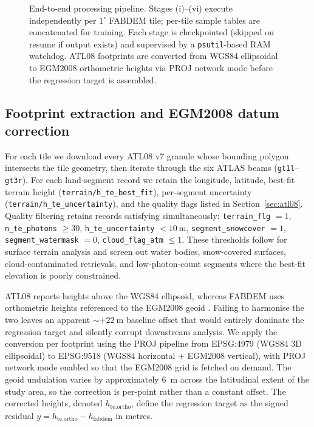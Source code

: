\documentclass[preprint,authoryear,number]{elsarticle}
\begin{document}
\begin{figure}[t]
\centering
\resizebox{\textwidth}{!}{}
\caption{End-to-end processing pipeline. Stages (i)--(vi) execute independently per $1^{\circ}$ FABDEM tile; per-tile sample tables are concatenated for training. Each stage is checkpointed (skipped on resume if output exists) and supervised by a \texttt{psutil}-based RAM watchdog. ATL08 footprints are converted from WGS84 ellipsoidal to EGM2008 orthometric heights via PROJ network mode before the regression target is assembled.}
\label{fig:pipeline}
\end{figure}

\subsection{Footprint extraction and EGM2008 datum correction}
\label{sec:egm2008}

For each tile we download every ATL08 v7 granule whose bounding polygon intersects the tile geometry, then iterate through the six ATLAS beams (\texttt{gt1l}--\texttt{gt3r}). For each land-segment record we retain the longitude, latitude, best-fit terrain height (\texttt{terrain/h\_te\_best\_fit}), per-segment uncertainty (\texttt{terrain/h\_te\_uncertainty}), and the quality flags listed in Section~\ref{sec:atl08}. Quality filtering retains records satisfying simultaneously: \texttt{terrain\_flg} $= 1$, \texttt{n\_te\_photons} $\geq 30$, \texttt{h\_te\_uncertainty} $< \SI{10}{\meter}$, \texttt{segment\_snowcover} $= 1$, \texttt{segment\_watermask} $= 0$, \texttt{cloud\_flag\_atm} $\leq 1$. These thresholds follow \citet{Neuenschwander2019ATL08} for surface terrain analysis and screen out water bodies, snow-covered surfaces, cloud-contaminated retrievals, and low-photon-count segments where the best-fit elevation is poorly constrained.

ATL08 reports heights above the WGS84 ellipsoid, whereas FABDEM uses orthometric heights referenced to the EGM2008 geoid \citep{Pavlis2012EGM2008}. Failing to harmonise the two leaves an apparent $\sim +\SI{22}{\meter}$ baseline offset that would entirely dominate the regression target and silently corrupt downstream analysis. We apply the conversion per footprint using the PROJ pipeline from EPSG:4979 (WGS84 3D ellipsoidal) to EPSG:9518 (WGS84 horizontal $+$ EGM2008 vertical), with PROJ network mode enabled so that the EGM2008 grid is fetched on demand. The geoid undulation varies by approximately \SI{6}{\meter} across the latitudinal extent of the study area, so the correction is per-point rather than a constant offset. The corrected heights, denoted $h_{\text{te,ortho}}$, define the regression target as the signed residual $y = h_{\text{te,ortho}} - h_{\text{fabdem}}$ in metres.
\end{document}
